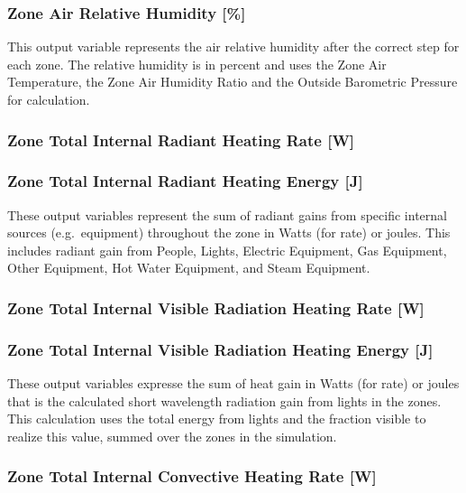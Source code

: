 \subsubsection{Zone Air Relative Humidity {[}\%{]}}\label{zone-air-relative-humidity}

This output variable represents the air relative humidity after the correct step for each zone. The relative humidity is in percent and uses the Zone Air Temperature, the Zone Air Humidity Ratio and the Outside Barometric Pressure for calculation.

\subsubsection{Zone Total Internal Radiant Heating Rate {[}W{]}}\label{zone-total-internal-radiant-heating-rate-w}

\subsubsection{Zone Total Internal Radiant Heating Energy {[}J{]}}\label{zone-total-internal-radiant-heating-energy-j}

These output variables represent the sum of radiant gains from specific internal sources (e.g.~equipment) throughout the zone in Watts (for rate) or joules. This includes radiant gain from People, Lights, Electric Equipment, Gas Equipment, Other Equipment, Hot Water Equipment, and Steam Equipment.

\subsubsection{Zone Total Internal Visible Radiation Heating Rate {[}W{]}}\label{zone-total-internal-visible-radiation-heating-rate-w}

\subsubsection{Zone Total Internal Visible Radiation Heating Energy {[}J{]}}\label{zone-total-internal-visible-radiation-heating-energy-j}

These output variables expresse the sum of heat gain in Watts (for rate) or joules that is the calculated short wavelength radiation gain from lights in the zones. This calculation uses the total energy from lights and the fraction visible to realize this value, summed over the zones in the simulation.

\subsubsection{Zone Total Internal Convective Heating Rate {[}W{]}}\label{zone-total-internal-convective-heating-rate-w}

